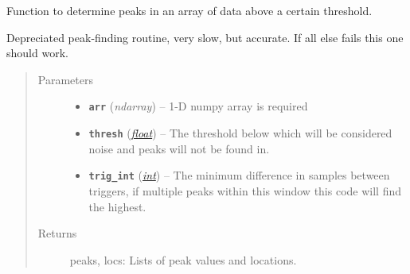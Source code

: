 \documentclass[a4paper,10pt,english]{sphinxmanual}
\begin{document}
\begin{fulllineitems}
\label{utils:findpeaks.find_peaks_dep}
Function to determine peaks in an array of data above a certain threshold.

Depreciated peak-finding routine, very slow, but accurate.  If all else fails
this one should work.
\begin{quote}\begin{description}
\item[{Parameters}] \leavevmode\begin{itemize}
\item {} 
\textbf{\texttt{arr}} (\emph{ndarray}) -- 1-D numpy array is required

\item {} 
\textbf{\texttt{thresh}} (\href{https://docs.python.org/library/functions.html\#float}{\emph{float}}) -- The threshold below which will be considered noise and peaks    will not be found in.

\item {} 
\textbf{\texttt{trig\_int}} (\href{https://docs.python.org/library/functions.html\#int}{\emph{int}}) -- The minimum difference in samples between triggers,    if multiple peaks within this window this code will find the highest.

\end{itemize}

\item[{Returns}] \leavevmode
peaks, locs: Lists of peak values and locations.

\end{description}\end{quote}

\end{fulllineitems}

\end{document}
